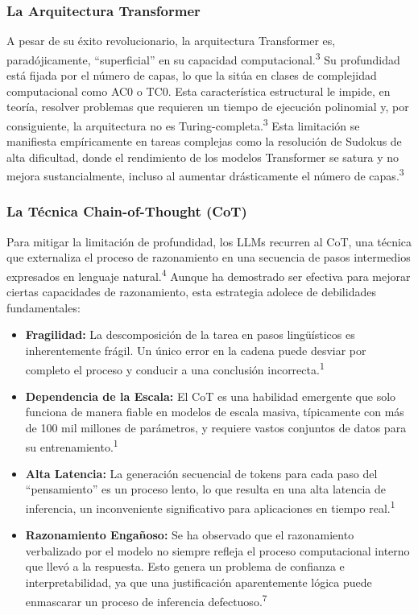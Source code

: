 \documentclass{article}
\begin{document}
	\subsubsection{La Arquitectura Transformer}
	A pesar de su éxito revolucionario, la arquitectura Transformer es, paradójicamente, ``superficial'' en su capacidad computacional.\textsuperscript{3} Su profundidad está fijada por el número de capas, lo que la sitúa en clases de complejidad computacional como AC0 o TC0. Esta característica estructural le impide, en teoría, resolver problemas que requieren un tiempo de ejecución polinomial y, por consiguiente, la arquitectura no es Turing-completa.\textsuperscript{3} Esta limitación se manifiesta empíricamente en tareas complejas como la resolución de Sudokus de alta dificultad, donde el rendimiento de los modelos Transformer se satura y no mejora sustancialmente, incluso al aumentar drásticamente el número de capas.\textsuperscript{3}
	
	\subsubsection{La Técnica Chain-of-Thought (CoT)}
	Para mitigar la limitación de profundidad, los LLMs recurren al CoT, una técnica que externaliza el proceso de razonamiento en una secuencia de pasos intermedios expresados en lenguaje natural.\textsuperscript{4} Aunque ha demostrado ser efectiva para mejorar ciertas capacidades de razonamiento, esta estrategia adolece de debilidades fundamentales:
	\begin{itemize}
		\item \textbf{Fragilidad:} La descomposición de la tarea en pasos lingüísticos es inherentemente frágil. Un único error en la cadena puede desviar por completo el proceso y conducir a una conclusión incorrecta.\textsuperscript{1}
		\item \textbf{Dependencia de la Escala:} El CoT es una habilidad emergente que solo funciona de manera fiable en modelos de escala masiva, típicamente con más de 100 mil millones de parámetros, y requiere vastos conjuntos de datos para su entrenamiento.\textsuperscript{1}
		\item \textbf{Alta Latencia:} La generación secuencial de tokens para cada paso del ``pensamiento'' es un proceso lento, lo que resulta en una alta latencia de inferencia, un inconveniente significativo para aplicaciones en tiempo real.\textsuperscript{1}
		\item \textbf{Razonamiento Engañoso:} Se ha observado que el razonamiento verbalizado por el modelo no siempre refleja el proceso computacional interno que llevó a la respuesta. Esto genera un problema de confianza e interpretabilidad, ya que una justificación aparentemente lógica puede enmascarar un proceso de inferencia defectuoso.\textsuperscript{7}
	\end{itemize}
	
\end{document}
